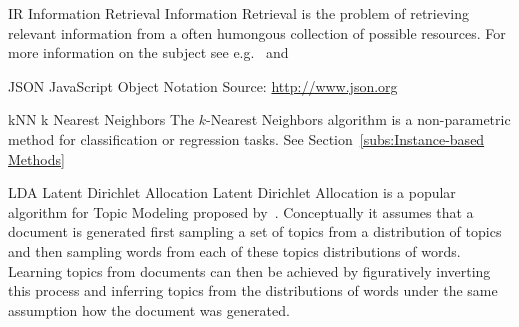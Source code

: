 

  {IR}
  {Information Retrieval}
  {Information Retrieval is the problem of retrieving relevant information from a often humongous collection of possible resources. For more information on the subject see e.g.~\cite{Rijsbergen:1979aa} and~\cite{Manning:2008aa}} %


  {JSON}
  {JavaScript Object Notation}
  { Source: \url{http://www.json.org}} %


  {kNN}
  {k Nearest Neighbors}
  {The $k$-Nearest Neighbors algorithm is a non-parametric method for classification or regression tasks. See Section~\ref{subs:Instance-based Methods}} %




  {LDA}
  {Latent Dirichlet Allocation}
  {Latent Dirichlet Allocation is a popular algorithm for \gls{Topic Modeling} proposed by~\cite{Blei:2003aa}. Conceptually it assumes that a document is generated first sampling a set of topics from a distribution of topics and then sampling words from each of these topics distributions of words. Learning topics from documents can then be achieved by figuratively inverting this process and inferring topics from the distributions of words under the same assumption how the document was generated.}

